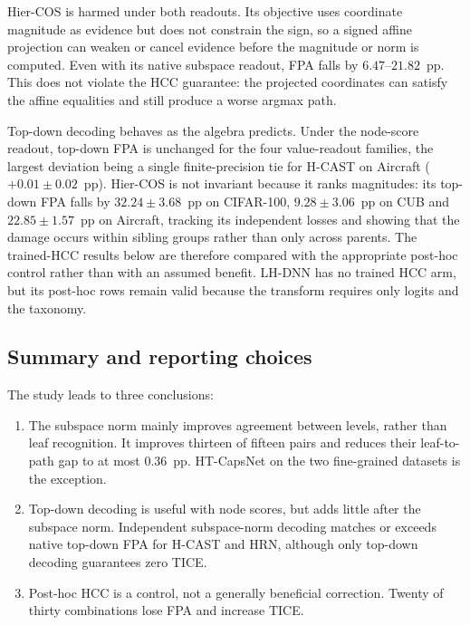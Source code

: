 Hier-COS is harmed under both readouts. Its objective uses coordinate magnitude
as evidence but does not constrain the sign, so a signed affine projection can
weaken or cancel evidence before the magnitude or norm is computed. Even with
its native subspace readout, FPA falls by $6.47$--$21.82$~pp. This does not
violate the HCC guarantee: the projected coordinates can satisfy the affine
equalities and still produce a worse argmax path.

Top-down decoding behaves as the algebra predicts. Under the node-score
readout, top-down FPA is unchanged for the four value-readout families, the
largest deviation being a single finite-precision tie for H-CAST on Aircraft
($+0.01\pm0.02$~pp). Hier-COS is not invariant because it ranks magnitudes: its
top-down FPA falls by $32.24\pm3.68$~pp on CIFAR-100, $9.28\pm3.06$~pp on CUB
and $22.85\pm1.57$~pp on Aircraft, tracking its independent losses and showing
that the damage occurs within sibling groups rather than only across parents. The trained-HCC results below are
therefore compared with the appropriate post-hoc control rather than with an
assumed benefit. LH-DNN has no trained HCC arm, but its post-hoc rows remain
valid because the transform requires only logits and the taxonomy.

\FloatBarrier

\subsection{Summary and reporting choices}
\label{ssec:results_inference_summary}

The study leads to three conclusions:

\begin{enumerate}
    \item The subspace norm mainly improves agreement between levels, rather
    than leaf recognition. It improves thirteen of fifteen pairs and reduces
    their leaf-to-path gap to at most $0.36$~pp. HT-CapsNet on the two
    fine-grained datasets is the exception.
    \item Top-down decoding is useful with node scores, but adds little after the
    subspace norm. Independent subspace-norm decoding matches or exceeds native
    top-down FPA for H-CAST and HRN, although only top-down decoding guarantees
    zero TICE.
    \item Post-hoc HCC is a control, not a generally beneficial correction.
    Twenty of thirty combinations lose FPA and increase TICE.
\end{enumerate}

